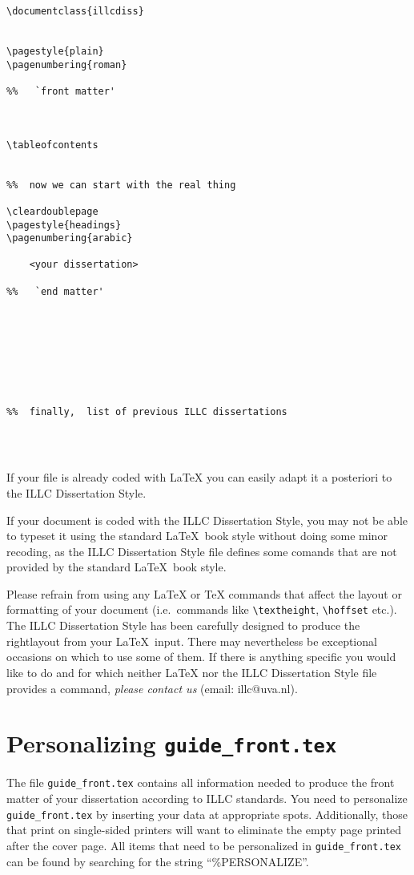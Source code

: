 \begin{verbatim}
\documentclass{illcdiss}


\pagestyle{plain}
\pagenumbering{roman}

%%   `front matter'



\tableofcontents


%%  now we can start with the real thing

\cleardoublepage
\pagestyle{headings}
\pagenumbering{arabic}
  
    <your dissertation>

%%   `end matter'








%%  finally,  list of previous ILLC dissertations




\end{verbatim}
%
%
If your file is already coded with \LaTeX{} you can easily
adapt it a posteriori to the ILLC Dissertation Style.

If your document is coded with the ILLC Dissertation Style,
you may not be able to typeset it using the standard \LaTeX\ book style
without doing some minor recoding,
as the ILLC Dissertation Style file defines some comands 
that are not provided by the standard \LaTeX\ book style.

Please refrain from using any \LaTeX{} or \TeX{} commands
that affect the layout or formatting of your document
(i.e.\ commands like \verb|\textheight|, \verb|\hoffset| etc.).
The ILLC Dissertation Style has been carefully designed 
to produce the rightlayout from your \LaTeX\ input.
There may nevertheless be exceptional occasions on which to use some of them.
If there is anything specific you would like to do 
and for which neither \LaTeX{} nor the ILLC Dissertation Style file 
provides a command,
{\em please contact us\/} (email: illc@uva.nl).

\section{Personalizing {\tt guide\_front.tex}}
The file {\tt guide\_front.tex} contains all information needed 
to produce the front matter of your dissertation according to ILLC standards.
You need to personalize {\tt guide\_front.tex} by inserting your data
at appropriate spots. Additionally, those that print on single-sided
printers will want to eliminate the empty page printed after the cover page.
All items that need to be personalized in 
{\tt guide\_front.tex} can be found by searching for the string 
``\%{}PERSONALIZE''.

